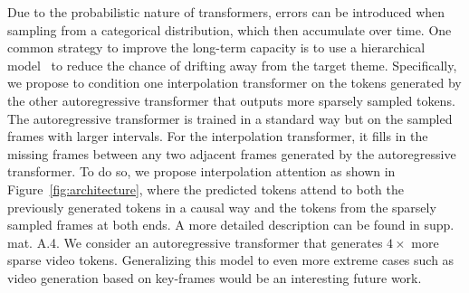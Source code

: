 Due to the probabilistic nature of transformers, errors can be introduced when sampling from a categorical distribution, which then accumulate over time.
One common strategy to improve the long-term capacity is to use a hierarchical model~\cite{fan2018hierarchical,castrejon2021hierarchical} to reduce the chance of drifting away from the target theme. 
Specifically, we propose to condition one interpolation transformer on the tokens generated by the other autoregressive transformer that outputs more sparsely sampled tokens. 
The autoregressive transformer is trained in a standard way but on the sampled frames with larger intervals. 
For the interpolation transformer, it fills in the missing frames between any two adjacent frames generated by the autoregressive transformer. 
To do so, we propose interpolation attention as shown in Figure~\ref{fig:architecture}, where the predicted tokens attend to both the previously generated tokens in a causal way and the tokens from the sparsely sampled frames at both ends. 
A more detailed description can be found in supp. mat. A.4.
We consider an autoregressive transformer that generates $4\times$ more sparse video tokens. 
Generalizing this model to even more extreme cases such as video generation based on key-frames would be an interesting future work.

